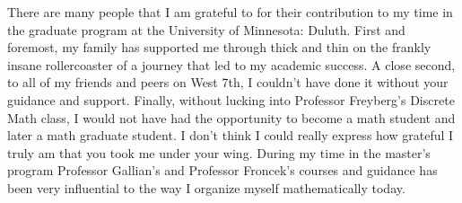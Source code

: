 There are many people that I am grateful to for their contribution to my time in the graduate program at the University of Minnesota: Duluth. First and foremost, my family has supported me through thick and thin on the frankly insane rollercoaster of a journey that led to my academic success. A close second, to all of my friends and peers on West 7th, I couldn't have done it without your guidance and support. Finally, without lucking into Professor Freyberg's Discrete Math class, I would not have had the opportunity to become a math student and later a math graduate student. I don't think I could really express how grateful I truly am that you took me under your wing. During my time in the master's program Professor Gallian's and Professor Froncek's courses and guidance has been very influential to the way I organize myself mathematically today.